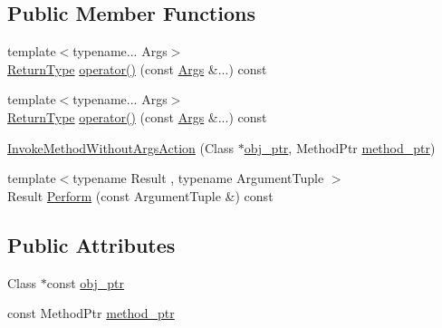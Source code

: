 \subsection*{Public Member Functions}
\begin{DoxyCompactItemize}
\item 
{\footnotesize template$<$typename... Args$>$ }\\\mbox{\hyperlink{structtesting_1_1internal_1_1_invoke_method_without_args_action_ad1acb81830c5636daf7c6d44064b4e58}{Return\+Type}} \mbox{\hyperlink{structtesting_1_1internal_1_1_invoke_method_without_args_action_a1f4e57fe7516b5106374d9acda304a99}{operator()}} (const \mbox{\hyperlink{namespacetesting_aaca153f67b689b8b9d5b8c67ecf8cee4}{Args}} \&...) const
\item 
{\footnotesize template$<$typename... Args$>$ }\\\mbox{\hyperlink{structtesting_1_1internal_1_1_invoke_method_without_args_action_ad1acb81830c5636daf7c6d44064b4e58}{Return\+Type}} \mbox{\hyperlink{structtesting_1_1internal_1_1_invoke_method_without_args_action_a1f4e57fe7516b5106374d9acda304a99}{operator()}} (const \mbox{\hyperlink{namespacetesting_aaca153f67b689b8b9d5b8c67ecf8cee4}{Args}} \&...) const
\item 
\mbox{\hyperlink{structtesting_1_1internal_1_1_invoke_method_without_args_action_ac4d655e386f47a96c7a6e1670b20e991}{Invoke\+Method\+Without\+Args\+Action}} (Class $\ast$\mbox{\hyperlink{structtesting_1_1internal_1_1_invoke_method_without_args_action_aca30496c75518566f1477b1b62fc6ada}{obj\+\_\+ptr}}, Method\+Ptr \mbox{\hyperlink{structtesting_1_1internal_1_1_invoke_method_without_args_action_a4f8dea00c7921dd60381f6c70273cb9f}{method\+\_\+ptr}})
\item 
{\footnotesize template$<$typename Result , typename Argument\+Tuple $>$ }\\Result \mbox{\hyperlink{structtesting_1_1internal_1_1_invoke_method_without_args_action_a9915e4f7a064e00b7798216644670b52}{Perform}} (const Argument\+Tuple \&) const
\end{DoxyCompactItemize}
\subsection*{Public Attributes}
\begin{DoxyCompactItemize}
\item 
Class $\ast$const \mbox{\hyperlink{structtesting_1_1internal_1_1_invoke_method_without_args_action_aca30496c75518566f1477b1b62fc6ada}{obj\+\_\+ptr}}
\item 
const Method\+Ptr \mbox{\hyperlink{structtesting_1_1internal_1_1_invoke_method_without_args_action_a4f8dea00c7921dd60381f6c70273cb9f}{method\+\_\+ptr}}
\end{DoxyCompactItemize}

